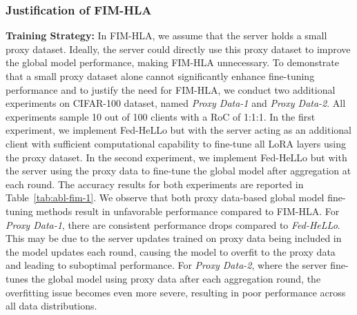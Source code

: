 \documentclass[lettersize,journal]{IEEEtran}
\begin{document}
\subsubsection{Justification of FIM-HLA}\label{subsubsec:fim-hla}
\textbf{Training Strategy:}
In FIM-HLA, we assume that the server holds a small proxy dataset. Ideally, the server could directly use this proxy dataset to improve the global model performance, making FIM-HLA unnecessary. To demonstrate that a small proxy dataset alone cannot significantly enhance fine-tuning performance and to justify the need for FIM-HLA, we conduct two additional experiments on CIFAR-100 dataset, named \textit{Proxy Data-1} and \textit{Proxy Data-2}. All experiments sample 10 out of 100 clients with a RoC of 1:1:1. In the first experiment, we implement Fed-HeLLo but with the server acting as an additional client with sufficient computational capability to fine-tune all LoRA layers using the proxy dataset. In the second experiment, we implement Fed-HeLLo but with the server using the proxy data to fine-tune the global model after aggregation at each round. The accuracy results for both experiments are reported in Table~\ref{tab:abl-fim-1}. 
We observe that both proxy data-based global model fine-tuning methods result in unfavorable performance compared to FIM-HLA. 
For \textit{Proxy Data-1}, there are consistent performance drops compared to \textit{Fed-HeLLo}. This may be due to the server updates trained on proxy data being included in the model updates each round, causing the model to overfit to the proxy data and leading to suboptimal performance. 
For \textit{Proxy Data-2}, where the server fine-tunes the global model using proxy data after each aggregation round, the overfitting issue becomes even more severe, resulting in poor performance across all data distributions.
\end{document}
